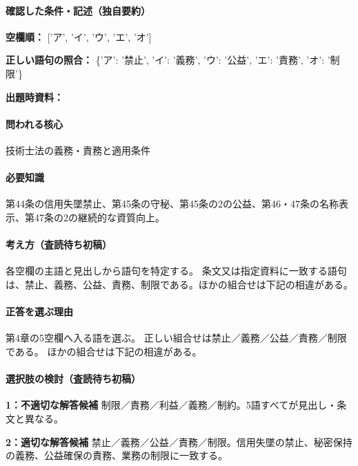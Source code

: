 \paragraph{確認した条件・記述（独自要約）}\mbox{}\par

\noindent\textbf{空欄順：} ['ア', 'イ', 'ウ', 'エ', 'オ']\par

\noindent\textbf{正しい語句の照合：} \{'ア': '禁止', 'イ': '義務', 'ウ': '公益', 'エ': '責務', 'オ': '制限'\}\par

\noindent\textbf{出題時資料：} \par

\paragraph{問われる核心} 技術士法の義務・責務と適用条件

\paragraph{必要知識} 第44条の信用失墜禁止、第45条の守秘、第45条の2の公益、第46・47条の名称表示、第47条の2の継続的な資質向上。

\paragraph{考え方（査読待ち初稿）} 各空欄の主語と見出しから語句を特定する。 条文又は指定資料に一致する語句は、禁止、義務、公益、責務、制限である。ほかの組合せは下記の相違がある。

\paragraph{正答を選ぶ理由} 第4章の5空欄へ入る語を選ぶ。 正しい組合せは禁止／義務／公益／責務／制限である。 ほかの組合せは下記の相違がある。

\paragraph{選択肢の検討（査読待ち初稿）}\mbox{}\par

\noindent\textbf{1：不適切な解答候補} 制限／責務／利益／義務／制約。5語すべてが見出し・条文と異なる。\par

\noindent\textbf{2：適切な解答候補} 禁止／義務／公益／責務／制限。信用失墜の禁止、秘密保持の義務、公益確保の責務、業務の制限に一致する。\par

